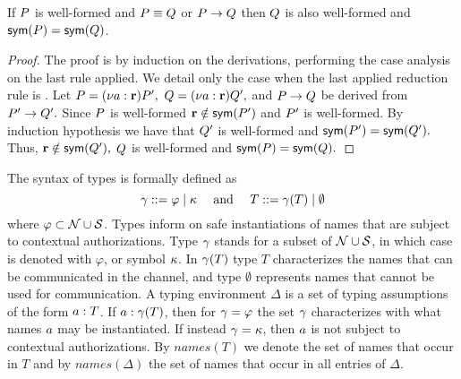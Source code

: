 \begin{proposition}\label{lemm:well-formed}
If $P$ is well-formed and $P\equiv Q$ or $P\rightarrow Q$ then $Q$ is also well-formed and $\mathsf{sym}(P)=\mathsf{sym}(Q)$.
\end{proposition}
\begin{proof}
The proof is by induction on the derivations, performing the case analysis on the last rule applied. We detail only the case when the last applied reduction rule is . Let $P=(\nu a: {\mathbf{r}})P',$ $Q=(\nu a: {\mathbf{r}})Q',$ and $P\rightarrow Q$ be derived from $P'\rightarrow Q'.$ Since $P$ is well-formed ${\mathbf{r}}\notin\mathsf{sym}(P')$ and $P'$ is well-formed. By induction hypothesis we have that $Q'$ is well-formed and $\mathsf{sym}(P')=\mathsf{sym}(Q').$ Thus, ${\mathbf{r}}\notin\mathsf{sym}(Q'),$ $Q$ is well-formed and $\mathsf{sym}(P)=\mathsf{sym}(Q).$
\end{proof}

The syntax of types is formally defined as
\[
\gamma ::=   \varphi  \;|\; {\mathbf{\kappa}} \quad \text{ and }
\quad T ::= \gamma(T) \;|\; \emptyset
\]
where $\varphi\subset{\cal N}\cup{\cal S}$.
Types inform on safe instantiations of names that are subject to contextual authorizations.
Type $\gamma$ stands for a subset of ${\cal N}\cup\cal{S}$, in which case is denoted with $\varphi$, or symbol ${\mathbf{\kappa}}$.
In $\gamma(T)$ type $T$ characterizes the names that can be communicated in the channel, and type $\emptyset$ represents names that cannot be used for communication. 
A typing environment $\Delta$ is a set of typing assumptions of the form $ a: T$. 
If $a:\gamma(T)$, then for $\gamma=\varphi$ the set $\gamma$ characterizes with what names $a$ may be instantiated. If instead $\gamma={\mathbf{\kappa}}$, then $a$ is not subject to 
contextual authorizations.
By $\mathit{names}(T)$ we denote the set of names that occur in $T$ and by $\mathit{names}(\Delta)$ the set of names that occur in all entries of $\Delta$.


